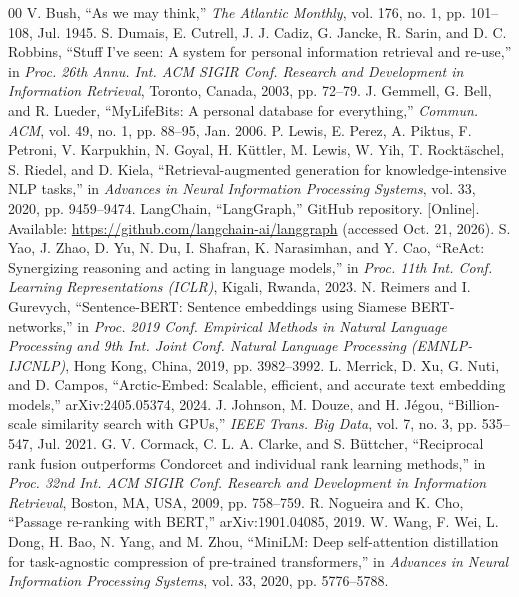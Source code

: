 \documentclass[conference]{IEEEtran}
\begin{document}
\IEEEtriggercmd{\enlargethispage{-3.7in}}
\begin{thebibliography}{00}
 V. Bush, ``As we may think,'' \textit{The Atlantic Monthly}, vol. 176, no. 1, pp. 101--108, Jul. 1945.
 S. Dumais, E. Cutrell, J. J. Cadiz, G. Jancke, R. Sarin, and D. C. Robbins, ``Stuff I've seen: A system for personal information retrieval and re-use,'' in \textit{Proc. 26th Annu. Int. ACM SIGIR Conf. Research and Development in Information Retrieval}, Toronto, Canada, 2003, pp. 72--79.
 J. Gemmell, G. Bell, and R. Lueder, ``MyLifeBits: A personal database for everything,'' \textit{Commun. ACM}, vol. 49, no. 1, pp. 88--95, Jan. 2006.
 P. Lewis, E. Perez, A. Piktus, F. Petroni, V. Karpukhin, N. Goyal, H. K\"{u}ttler, M. Lewis, W. Yih, T. Rockt\"{a}schel, S. Riedel, and D. Kiela, ``Retrieval-augmented generation for knowledge-intensive NLP tasks,'' in \textit{Advances in Neural Information Processing Systems}, vol. 33, 2020, pp. 9459--9474.
 LangChain, ``LangGraph,'' GitHub repository. [Online]. Available: \url{https://github.com/langchain-ai/langgraph} (accessed Oct. 21, 2026).
 S. Yao, J. Zhao, D. Yu, N. Du, I. Shafran, K. Narasimhan, and Y. Cao, ``ReAct: Synergizing reasoning and acting in language models,'' in \textit{Proc. 11th Int. Conf. Learning Representations (ICLR)}, Kigali, Rwanda, 2023.
 N. Reimers and I. Gurevych, ``Sentence-BERT: Sentence embeddings using Siamese BERT-networks,'' in \textit{Proc. 2019 Conf. Empirical Methods in Natural Language Processing and 9th Int. Joint Conf. Natural Language Processing (EMNLP-IJCNLP)}, Hong Kong, China, 2019, pp. 3982--3992.
 L. Merrick, D. Xu, G. Nuti, and D. Campos, ``Arctic-Embed: Scalable, efficient, and accurate text embedding models,'' arXiv:2405.05374, 2024.
 J. Johnson, M. Douze, and H. J\'{e}gou, ``Billion-scale similarity search with GPUs,'' \textit{IEEE Trans. Big Data}, vol. 7, no. 3, pp. 535--547, Jul. 2021.
 G. V. Cormack, C. L. A. Clarke, and S. B\"{u}ttcher, ``Reciprocal rank fusion outperforms Condorcet and individual rank learning methods,'' in \textit{Proc. 32nd Int. ACM SIGIR Conf. Research and Development in Information Retrieval}, Boston, MA, USA, 2009, pp. 758--759.
 R. Nogueira and K. Cho, ``Passage re-ranking with BERT,'' arXiv:1901.04085, 2019.
 W. Wang, F. Wei, L. Dong, H. Bao, N. Yang, and M. Zhou, ``MiniLM: Deep self-attention distillation for task-agnostic compression of pre-trained transformers,'' in \textit{Advances in Neural Information Processing Systems}, vol. 33, 2020, pp. 5776--5788.

\end{thebibliography}
\end{document}
